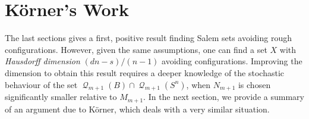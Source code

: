 \documentclass[12pt,reqno]{article}
\numberwithin{equation}{section}
\DeclareMathOperator{\DQ}{\mathcal{Q}}
\begin{document}
\begin{comment}
It is easy to see from our proof that for each $m$,
%
\[ \#(\DQ_m(X_m)) = \frac{1}{(M_1 \dots M_m)^d}. \]
%
Thus
%
\begin{align*}
    \log_{1/l_m}(\#(\DQ_m(X_m))) &= \frac{d \log(M_1 \dots M_m)}{\log(N_1 \dots N_m)}\\
    &\sim \frac{d \log(M_m)}{\log(N_m)}\\
    &= \frac{d \log(M_m)}{\log(M_m) + \log(K_m)}\\
    &= \frac{d}{1 + \log_{M_m}(K_m)}\\
    &\sim \frac{d}{1 + \left(\frac{s}{dn - s} + c\varepsilon \right)}\\
    &= \frac{d}{\frac{dn}{dn - s} + c\varepsilon_m}.
\end{align*}
%
Thus
%
\[ \lim_{m \to \infty} \log_{1/l_m}(\#(\DQ_m(X_m))) \leq \frac{dn - s}{n}. \]
%
In particular, this means $X$ has lower Minkowski dimension at most $(dn - s)/n$, which, together with the Fourier dimension bound, implies that $X$ is Salem.
\end{comment}

\section{K\"{o}rner's Work}

The last sections gives a first, positive result finding Salem sets avoiding rough configurations. However, given the same assumptions, one can find a set $X$ with \emph{Hausdorff dimension} $(dn - s)/(n-1)$ avoiding configurations. Improving the dimension to obtain this result requires a deeper knowledge of the stochastic behaviour of the set $\DQ_{m+1}(B) \cap \DQ_{m+1}(S^n)$, when $N_{m+1}$ is chosen significantly smaller relative to $M_{m+1}$. In the next section, we provide a summary of an argument due to K\"{o}rner, which deals with a very similar situation.
\end{document}
